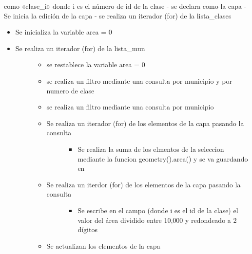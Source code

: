 \documentclass[letterpaper,10pt,spanish]{sphinxmanual}
\begin{document}
como «clase\_i» donde i es el número de id de la clase
- se declara  como la capa 
- Se inicia la edición de la capa 
- se realiza un iterador (for) de la lista\_clases
\begin{itemize}
\item {} 
Se inicializa la variable area = 0

\item {} \begin{description}
\item[{Se realiza un iterador (for) de la lista\_mun}] \leavevmode\begin{itemize}
\item {} 
se restablece la variable area = 0

\item {} 
se realiza un filtro mediante una consulta por municipio y por numero de clase 

\item {} 
se realiza un filtro mediante una consulta por municipio  

\item {} \begin{description}
\item[{Se realiza un iterador (for) de los elementos de la capa  pasando la consulta }] \leavevmode\begin{itemize}
\item {} 
Se realiza la suma de los elmentos de la seleccion mediante la funcion geometry().area() y se va guardando en 

\end{itemize}

\end{description}

\item {} \begin{description}
\item[{Se realiza un iterdor (for) de los elementos de la capa   pasando la consulta }] \leavevmode\begin{itemize}
\item {} 
Se escribe en el campo  (donde i es el id de la clase) el valor del área dividido entre 10,000 y redondeado a 2 dígitos

\end{itemize}

\end{description}

\item {} 
Se actualizan los elementos de la capa 

\end{itemize}

\end{description}

\end{itemize}
\end{document}
